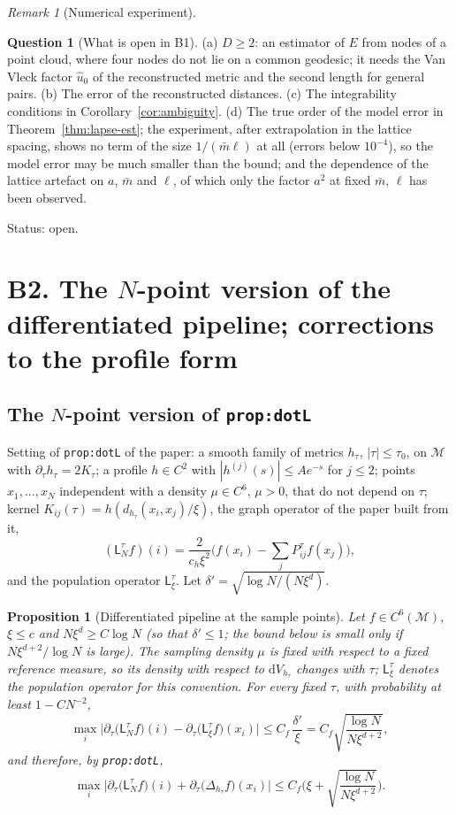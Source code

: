 \documentclass[a4paper,11pt]{article}
\newtheorem{proposition}[theorem]{Proposition}
\theoremstyle{definition}
\newtheorem{question}[theorem]{Question}
\theoremstyle{remark}
\newtheorem{remark}[theorem]{Remark}
\newcommand{\M}{\mathcal{M}}
\newcommand{\dd}{\mathrm{d}}
\newcommand{\Lc}{\mathsf{L}}
\newcommand{\status}[1]{\par\noindent\textsf{\small Status: #1}\par}
\begin{document}
\begin{remark}[Numerical experiment]
\end{remark}

\begin{question}[What is open in B1]\label{q:b1}
\textup{(a)} $D\ge2$: an estimator of $E$ from nodes of a point cloud, where four nodes do not lie on a common geodesic; it needs the Van Vleck factor $\hat u_0$ of the reconstructed metric and the second length for general pairs. \textup{(b)} The error of the reconstructed distances. \textup{(c)} The integrability conditions in Corollary~\ref{cor:ambiguity}. \textup{(d)} The true order of the model error in Theorem~\ref{thm:lapse-est}; the experiment, after extrapolation in the lattice spacing, shows no term of the size $1/(\bar m\ell)$ at all (errors below $10^{-4}$), so the model error may be much smaller than the bound; and the dependence of the lattice artefact on $a$, $\bar m$ and $\ell$, of which only the factor $a^2$ at fixed $\bar m$, $\ell$ has been observed.
\end{question}
\status{open.}

\section{B2. The $N$-point version of the differentiated pipeline; corrections to the profile form}

\subsection{The $N$-point version of \texttt{prop:dotL}}

Setting of \texttt{prop:dotL} of the paper: a smooth family of metrics $h_\tau$, $|\tau|\le\tau_0$, on $\M$ with $\partial_\tau h_\tau=2K_\tau$; a profile $h\in C^2$ with $|h^{(j)}(s)|\le Ae^{-s}$ for $j\le2$; points $x_1,\dots,x_N$ independent with a density $\mu\in C^6$, $\mu>0$, that do not depend on $\tau$; kernel $K_{ij}(\tau)=h(d_{h_\tau}(x_i,x_j)/\xi)$, the graph operator of the paper built from it,
\[
(\Lc_N^\tau f)(i)=\frac{2}{c_h\xi^2}\Big(f(x_i)-\sum_jP^\tau_{ij}f(x_j)\Big),
\]
and the population operator $\Lc^\tau_\xi$. Let $\delta'=\sqrt{\log N/(N\xi^d)}$.

\begin{proposition}[Differentiated pipeline at the sample points]\label{prop:dotLN}
Let $f\in C^6(\M)$, $\xi\le c$ and $N\xi^{d}\ge C\log N$ (so that $\delta'\le1$; the bound below is small only if $N\xi^{d+2}/\log N$ is large). The sampling density $\mu$ is fixed with respect to a fixed reference measure, so its density with respect to $\dd V_{h_\tau}$ changes with $\tau$; $\Lc^\tau_\xi$ denotes the population operator for this convention. For every fixed $\tau$, with probability at least $1-CN^{-2}$,
\[
\max_i\Big|\partial_\tau\big(\Lc^\tau_Nf\big)(i)-\partial_\tau\big(\Lc^\tau_\xi f\big)(x_i)\Big|\le C_f\,\frac{\delta'}{\xi}=C_f\sqrt{\frac{\log N}{N\xi^{d+2}}},
\]
and therefore, by \texttt{prop:dotL},
\[
\max_i\Big|\partial_\tau\big(\Lc^\tau_Nf\big)(i)+\partial_\tau\big(\Delta_{h_\tau}f\big)(x_i)\Big|\le C_f\Big(\xi+\sqrt{\frac{\log N}{N\xi^{d+2}}}\Big).
\]
\end{proposition}
\end{document}
